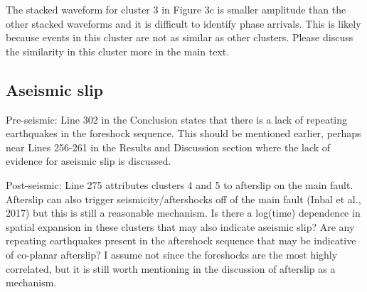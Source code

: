 \documentclass[10pt]{extarticle}
\begin{document}
\begin{Answer}
 \WorkInProgressRevTask
\end{Answer}
%
%



\begin{ReviewerComment}{1}
\noindent 
The stacked waveform for cluster 3 in Figure 3c is smaller amplitude than the other stacked waveforms and it is difficult to identify phase arrivals. This is likely because events in this cluster are not as similar as other clusters. Please discuss the similarity in this cluster more in the main text.

\end{ReviewerComment}


\begin{Answer}
 \WorkInProgressRevTask
\end{Answer}
%
%


\subsection*{Aseismic slip}


\begin{ReviewerComment}{1}
\noindent 
Pre-seismic: Line 302 in the Conclusion states that there is a lack of repeating earthquakes in the foreshock sequence. This should be mentioned earlier, perhaps near Lines 256-261 in the Results and Discussion section where the lack of evidence for aseismic slip is discussed.

\end{ReviewerComment}


\begin{Answer}
 \WorkInProgressRevTask
\end{Answer}
%
%



\begin{ReviewerComment}{1}
\noindent 
Post-seismic: Line 275 attributes clusters 4 and 5 to afterslip on the main fault. Afterslip can also trigger seismicity/aftershocks off of the main fault (Inbal et al., 2017) but this is still a reasonable mechanism. Is there a log(time) dependence in spatial expansion in these clusters that may also indicate aseismic slip? Are any repeating earthquakes present in the aftershock sequence that may be indicative of co-planar afterslip? I assume not since the foreshocks are the most highly correlated, but it is still worth mentioning in the discussion of afterslip as a mechanism.
\end{ReviewerComment}
\end{document}
